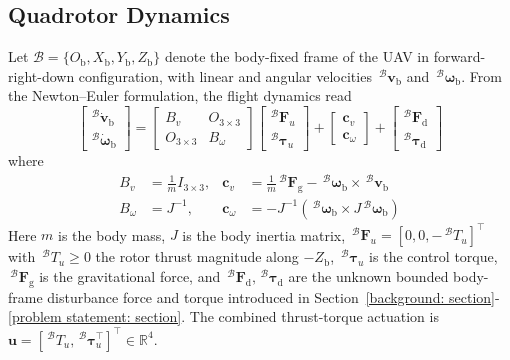 \subsection{Quadrotor Dynamics} \label{quadrotor dynamics: section}
Let $\mathcal{B}=\{O_{\text{b}},X_{\text{b}},Y_{\text{b}},Z_{\text{b}}\}$ denote the body-fixed frame of the UAV in forward-right-down configuration, with linear and angular velocities $\,^\mathcal{B}\boldsymbol{v}_\text{b}$ and $\,^\mathcal{B}\boldsymbol{\omega}_\text{b}$. From the Newton--Euler formulation, the flight dynamics read
\begin{equation}
\label{quadrotor dynamics: equation}
    \begin{bmatrix} ^\mathcal{B} \dot{\boldsymbol{v}}_{\text{b}} \\ ^\mathcal{B} \dot{\boldsymbol{\omega}}_{\text{b}} \end{bmatrix} = \begin{bmatrix} B_v & O_{3 \times 3} \\ O_{3 \times 3} & B_{\omega} \end{bmatrix} \begin{bmatrix} ^\mathcal{B} \boldsymbol{F}_u \\ ^\mathcal{B} \boldsymbol{\tau}_u \end{bmatrix} + \begin{bmatrix} \boldsymbol{c}_v \\ \boldsymbol{c}_{\omega} \end{bmatrix} + \begin{bmatrix} ^\mathcal{B} \boldsymbol{F}_\text{d} \\ ^\mathcal{B} \boldsymbol{\tau}_\text{d} \end{bmatrix}
 \end{equation}
 where
 \begin{align*}
     B_v &= \frac{1}{m} I_{3 \times 3}, & \boldsymbol{c}_v &= \frac{1}{m} \,^\mathcal{B} \boldsymbol{F}_\text{g} - \,^\mathcal{B} \boldsymbol{\omega}_{\text{b}} \times \,^\mathcal{B} \boldsymbol{v}_{\text{b}} \\ B_{\omega} &= J^{-1}, & \boldsymbol{c}_{\omega} &= - J^{-1}\left(\,^\mathcal{B} \boldsymbol{\omega}_{\text{b}} \times J \,^\mathcal{B} \boldsymbol{\omega}_{\text{b}} \right)
 \end{align*}
Here $m$ is the body mass, $J$ is the body inertia matrix, $\,^\mathcal{B} \boldsymbol{F}_u = [0,0,-\,^\mathcal{B} T_u]^\top$ with $\,^\mathcal{B} T_u\ge 0$ the rotor thrust magnitude along $-Z_\text{b}$, $\,^\mathcal{B} \boldsymbol{\tau}_u$ is the control torque, $\,^\mathcal{B} \boldsymbol{F}_\text{g}$ is the gravitational force, and $\,^\mathcal{B} \boldsymbol{F}_\text{d},\,^\mathcal{B} \boldsymbol{\tau}_\text{d}$ are the unknown bounded body-frame disturbance force and torque introduced in Section~\ref{background: section}-\ref{problem statement: section}. The combined thrust-torque actuation is $\boldsymbol{u}=[\,^\mathcal{B}T_u,\,^\mathcal{B}\boldsymbol{\tau}_u^\top]^\top\in\mathbb{R}^4$.

